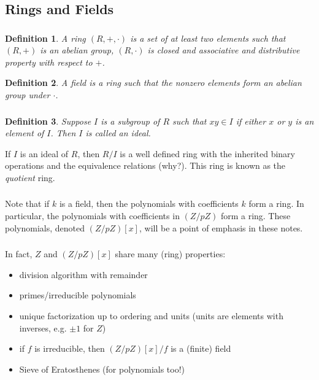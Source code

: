 \documentclass{article}
\newtheorem{definition}{Definition}
\begin{document}
\subsection{Rings and Fields}
\subsubsection{}
\begin{definition}
    A ring $(R, +, \cdot)$ is a set of at least two elements such that $(R, +)$ is an abelian group, $(R, \cdot)$ is closed and associative and distributive property with respect to $+$. 
\end{definition}
\begin{definition}
    A field is a ring such that the nonzero elements form an abelian group under $\cdot$.
\end{definition}

\subsubsection{}
\begin{definition}
    Suppose $I$ is a subgroup of $R$ such that $xy \in I$ if either $x$ or $y$ is an element of $I$. Then $I$ is called an ideal.
\end{definition}
    If $I$ is an ideal of $R$, then $R/I$ is a well defined ring with the inherited binary operations and the equivalence relations (why?). This ring is known as the \textit{quotient} ring.
    
\subsubsection{}
Note that if $k$ is a field, then the polynomials with coefficients $k$ form a ring. In particular, the polynomials with coefficients in $(Z/pZ)$ form a ring. These polynomials, denoted $(Z/pZ)[x]$, will be a point of emphasis in these notes.

\subsubsection{}
In fact, $Z$ and $(Z/pZ)[x]$ share many (ring) properties:
\begin{itemize}
    \item division algorithm with remainder
    \item primes/irreducible polynomials
    \item unique factorization up to ordering and units (units are elements with inverses, e.g. $\pm 1$ for $Z$)
    \item if $f$ is irreducible, then $(Z/pZ)[x]/f$ is a (finite) field
    \item Sieve of Eratosthenes (for polynomials too!)
\end{itemize}
\end{document}
